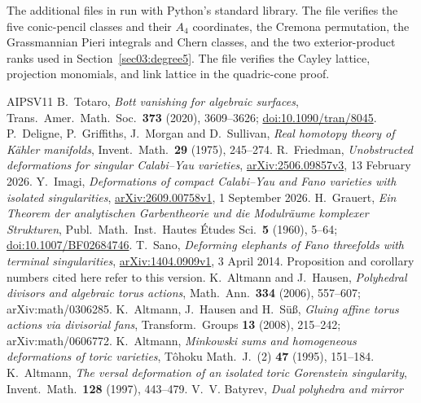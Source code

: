 \documentclass[11pt]{amsart}
\theoremstyle{definition}
\theoremstyle{remark}
\theoremstyle{plain}
\begin{document}
The additional files in  run with Python's
standard library.  The file 
verifies the five conic-pencil classes and their $A_4$ coordinates,
the Cremona permutation, the Grassmannian Pieri integrals and
Chern classes, and the two exterior-product ranks used in
Section~\ref{sec03:degree5}.  The file
 verifies the Cayley lattice,
projection monomials, and link lattice in the quadric-cone proof.

\begin{thebibliography}{AIPSV11}
 B.~Totaro, \emph{Bott vanishing for
algebraic surfaces}, Trans.\ Amer.\ Math.\ Soc.\ \textbf{373}
(2020), 3609--3626;
\href{https://doi.org/10.1090/tran/8045}{doi:10.1090/tran/8045}.
 P.~Deligne, P.~Griffiths, J.~Morgan and
D.~Sullivan, \emph{Real homotopy theory of K\"ahler manifolds},
Invent.\ Math.\ \textbf{29} (1975), 245--274.
 R.~Friedman, \emph{Unobstructed
deformations for singular Calabi--Yau varieties},
\href{https://arxiv.org/abs/2506.09857v3}{arXiv:2506.09857v3},
13 February 2026.
 Y.~Imagi, \emph{Deformations of compact
Calabi--Yau and Fano varieties with isolated singularities},
\href{https://arxiv.org/abs/2609.00758v1}{arXiv:2609.00758v1},
1 September 2026.
 H.~Grauert, \emph{Ein Theorem der
analytischen Garbentheorie und die Modulr\"aume komplexer Strukturen},
Publ.\ Math.\ Inst.\ Hautes \'Etudes Sci.\ \textbf{5} (1960), 5--64;
\href{https://doi.org/10.1007/BF02684746}{doi:10.1007/BF02684746}.
 T.~Sano, \emph{Deforming elephants of Fano
threefolds with terminal singularities},
\href{https://arxiv.org/abs/1404.0909v1}{arXiv:1404.0909v1},
3 April 2014.  Proposition and corollary numbers cited here refer
to this version.
 K.~Altmann and J.~Hausen, \emph{Polyhedral divisors and
algebraic torus actions}, Math.\ Ann.\ \textbf{334} (2006), 557--607;
arXiv:math/0306285.
 K.~Altmann, J.~Hausen and H.~S\"u\ss, \emph{Gluing affine
torus actions via divisorial fans}, Transform.\ Groups \textbf{13} (2008),
215--242; arXiv:math/0606772.
 K.~Altmann, \emph{Minkowski sums and homogeneous
deformations of toric varieties}, T\^ohoku Math.\ J.\ (2) \textbf{47} (1995),
151--184.
 K.~Altmann, \emph{The versal deformation of an
isolated toric Gorenstein singularity}, Invent.\ Math.\ \textbf{128} (1997),
443--479.
 V.~V. Batyrev, \emph{Dual polyhedra and mirror
}
\end{thebibliography}
\end{document}
